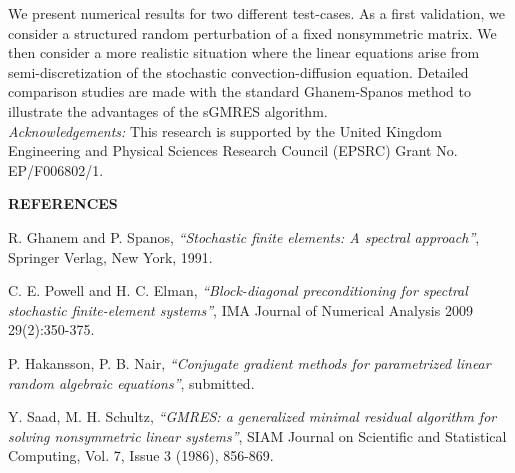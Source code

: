\documentclass{report}
\begin{document}
We present numerical results for two different test-cases. As a first
validation, we consider a structured random perturbation of a fixed
nonsymmetric matrix. We then consider a more realistic situation where
the linear equations arise from semi-discretization of the stochastic
convection-diffusion equation. Detailed comparison studies are made with
the standard Ghanem-Spanos method to illustrate the advantages of the
sGMRES algorithm.\\[1ex]

\noindent
{\em Acknowledgements:} This research is supported by the United Kingdom
Engineering and Physical Sciences Research Council (EPSRC) Grant No.
EP/F006802/1. \\[1ex]

\begin{center}
{\bf REFERENCES}
\end{center}

\noindent
[1] R. Ghanem and P. Spanos, {\it{``Stochastic finite elements: A
spectral approach''}}, Springer Verlag, New York, 1991.

\noindent
[2] C. E. Powell and H. C. Elman, {\it{``Block-diagonal preconditioning
for spectral stochastic finite-element systems''}}, IMA Journal of
Numerical Analysis 2009 29(2):350-375.

\noindent
[3] P. Hakansson, P. B. Nair, {\it{``Conjugate gradient methods for
parametrized linear random algebraic equations''}}, submitted.

\noindent
[4] Y. Saad, M. H. Schultz, {\it{``GMRES: a generalized minimal residual
algorithm for solving nonsymmetric linear systems''}},
SIAM Journal on Scientific and Statistical Computing, Vol. 7, Issue 3 (1986), 856-869.
\end{document}
